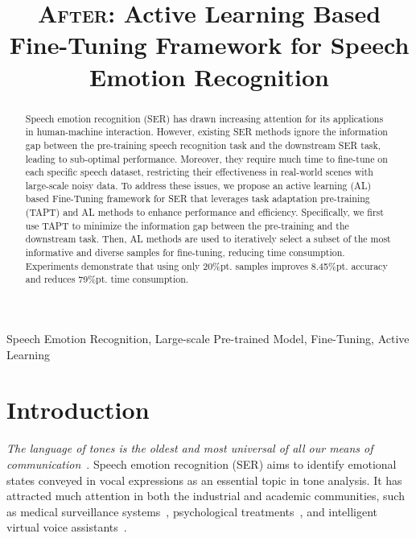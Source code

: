 \documentclass{article}
\title{\textsc{After}: Active Learning Based Fine-Tuning Framework for Speech Emotion Recognition}
\begin{document}
\maketitle

\begin{abstract}
Speech emotion recognition (SER) has drawn increasing attention for its applications in human-machine interaction.
However, existing SER methods ignore the information gap between the pre-training speech recognition task and the downstream SER task, leading to sub-optimal performance. 
Moreover, they require much time to fine-tune on each specific speech dataset, restricting their effectiveness in real-world scenes with large-scale noisy data.
To address these issues, we propose an active learning (AL) based Fine-Tuning framework for SER that leverages task adaptation pre-training (TAPT) and AL methods to enhance performance and efficiency.
Specifically, we first use TAPT to minimize the information gap between the pre-training and the downstream task. 
Then, AL methods are used to iteratively select a subset of the most informative and diverse samples for fine-tuning, reducing time consumption.
Experiments demonstrate that using only 20\%pt. samples improves 8.45\%pt. accuracy and reduces 79\%pt. time consumption.
\end{abstract}
%
\begin{keywords}
Speech Emotion Recognition, Large-scale Pre-trained Model, Fine-Tuning, Active Learning
\end{keywords}
%
\section{Introduction}
\label{sec:intro}

\textit{The language of tones is the oldest and most universal of all our means of communication}~\cite{blanton}. Speech emotion recognition (SER) aims to identify emotional states conveyed in vocal expressions as an essential topic in tone analysis. 
It has attracted much attention in both the industrial and academic communities, such as medical surveillance systems~\cite{clavel2008fear}, psychological treatments~\cite{elsayed2022speech,DBLP:conf/coling/LiYFO22}, and intelligent virtual voice assistants~\cite{la2020human}.
\end{document}
